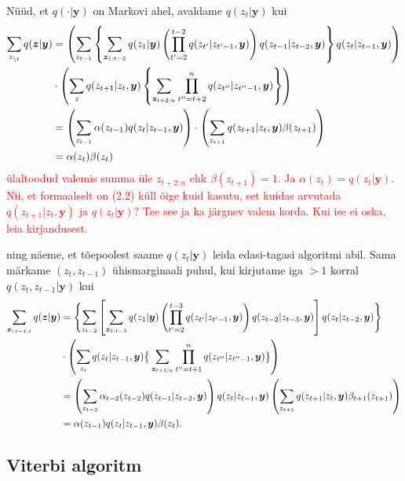 Nüüd, et $q(\cdot | \bm{y})$ on Markovi ahel, avaldame $q(z_t | \bm{y})$ kui
\begin{align} \notag
    \sum_{ z_{\backslash t} } q(\bm{z} | \bm{y}) &= \left( \sum_{z_{t-1}} \left\{ \sum_{\bm{z}_{1:t-2}} q(z_1 | \bm{y}) \left( \prod_{t'=2}^{t-2} q(z_{t'} | z_{t'-1}, \bm{y}) \right) q(z_{t-1} | z_{t-2}, \bm{y}) \right\} q(z_t | z_{t-1}, \bm{y}) \right) \\
    \notag
    & \cdot \left( \sum_{z} q(z_{t+1} | z_t, \bm{y}) \left\{ \sum_{\bm{z}_{t+2:n}} \prod_{t''=t+2}^n q(z_{t''}|z_{t''-1},\bm{y}) \right\} \right) \\
    \notag
    &= \left( \sum_{z_{t-1}} \alpha(z_{t-1}) q(z_t | z_{t-1}, \bm{y}) \right) \cdot \left( \sum_{z_{t+1}} q(z_{t+1} | z_t, \bm{y}) \beta(z_{t+1}) \right)\\
    \label{eq:fb1}
    &= \alpha(z_t) \beta(z_t)
\end{align}
\textcolor{red}{ülaltoodud valemis summa üle $z_{t+2:n}$ ehk $\beta (z_{t+1})=1$. Ja $\alpha(z_t)=q(z_t|\bm{y}).$ Nii, et formaalselt on (2.2) küll õige kuid kasutu, set kuidas arvutada  $q(z_{t+1} | z_t, \bm{y}) $ ja  $q(z_t|\bm{y})?$ Tee see ja ka järgnev valem korda. Kui ise ei oska, leia kirjandusest.}

ning näeme, et tõepoolest saame $q(z_t | \bm{y})$ leida edasi-tagasi algoritmi abil. Sama märkame $(z_t, z_{t-1})$ ühismarginaali puhul, kui kirjutame iga $>1$ korral $q(z_t, z_{t-1} | \bm{y})$ kui
\begin{align}
\notag
     \sum_{ \bm{z}_{\backslash t-1, t} } q(\bm{z} | \bm{y}) &= \Biggl\{ \sum_{z_{t-2}} \left[ \sum_{\bm{z}_{1:t-3}} q(z_1 | \bm{y}) \left( \prod_{t'=2}^{t-3} q(z_{t'} | z_{t'-1}, \bm{y}) \right) q(z_{t-2} | z_{t-3}, \bm{y}) \right] q(z_t | z_{t-2}, \bm{y}) \Biggr\} \\
    \notag
     & \cdot \left( \sum_{z_t} q(z_{t} | z_{t-1}, \bm{y}) \big\{ \sum_{\bm{z}_{t+1:n}} \prod_{t''=t+1}^n q(z_{t''}|z_{t''-1},\bm{y}) \big\} \right) \\
    \notag
    &= \left( \sum_{z_{t-2}} \alpha_{t-2}(z_{t-2}) q(z_{t-1} | z_{t-2}, \bm{y}) \right) q(z_{t} | z_{t-1}, \bm{y}) \left( \sum_{z_{t+1}} q(z_{t+1} | z_{t}, \bm{y}) \beta_{t+1}(z_{t+1}) \right)\\
    \label{eq:fb2}
    &= \alpha(z_{t-1}) q(z_t|z_{t-1},\bm{y}) \beta(z_t)  .
\end{align}

\subsection{Viterbi algoritm}


